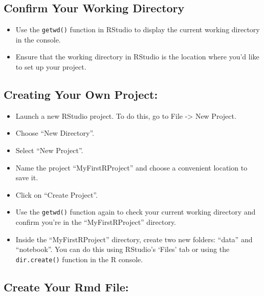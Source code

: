 \documentclass[
]{book}
\providecommand{\tightlist}{%
  \setlength{\itemsep}{0pt}\setlength{\parskip}{0pt}}
\begin{document}
\hypertarget{confirm-your-working-directory}{%
\subsection{Confirm Your Working Directory}\label{confirm-your-working-directory}}

\begin{itemize}
\tightlist
\item
  Use the \texttt{getwd()} function in RStudio to display the current working directory in the console.
\item
  Ensure that the working directory in RStudio is the location where you'd like to set up your project.
\end{itemize}

\hypertarget{creating-your-own-project}{%
\subsection{Creating Your Own Project:}\label{creating-your-own-project}}

\begin{itemize}
\tightlist
\item
  Launch a new RStudio project. To do this, go to File -\textgreater{} New Project.
\item
  Choose ``New Directory''.
\item
  Select ``New Project''.
\item
  Name the project ``MyFirstRProject'' and choose a convenient location to save it.
\item
  Click on ``Create Project''.
\item
  Use the \texttt{getwd()} function again to check your current working directory and confirm you're in the ``MyFirstRProject'' directory.
\item
  Inside the ``MyFirstRProject'' directory, create two new folders: ``data'' and ``notebook''. You can do this using RStudio's `Files' tab or using the \texttt{dir.create()} function in the R console.
\end{itemize}

\hypertarget{create-your-rmd-file}{%
\subsection{Create Your Rmd File:}\label{create-your-rmd-file}}
\end{document}
